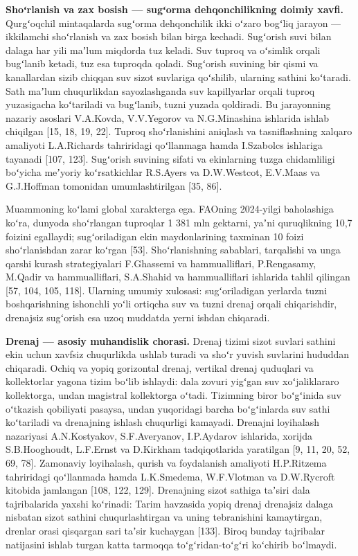 

\textbf{Shoʻrlanish va zax bosish --- sugʻorma dehqonchilikning doimiy
xavfi.} Qurgʻoqchil mintaqalarda sugʻorma dehqonchilik ikki oʻzaro
bogʻliq jarayon --- ikkilamchi shoʻrlanish va zax bosish bilan birga
kechadi. Sugʻorish suvi bilan dalaga har yili maʼlum miqdorda tuz
keladi. Suv tuproq va oʻsimlik orqali bugʻlanib ketadi, tuz esa tuproqda
qoladi. Sugʻorish suvining bir qismi va kanallardan sizib chiqqan suv
sizot suvlariga qoʻshilib, ularning sathini koʻtaradi. Sath maʼlum
chuqurlikdan sayozlashganda suv kapillyarlar orqali tuproq yuzasigacha
koʻtariladi va bugʻlanib, tuzni yuzada qoldiradi. Bu jarayonning nazariy
asoslari V.A.Kovda, V.V.Yegorov va N.G.Minashina ishlarida ishlab
chiqilgan {[}15, 18, 19, 22{]}. Tuproq shoʻrlanishini aniqlash va
tasniflashning xalqaro amaliyoti L.A.Richards tahriridagi qoʻllanmaga
hamda I.Szabolcs ishlariga tayanadi {[}107, 123{]}. Sugʻorish suvining
sifati va ekinlarning tuzga chidamliligi boʻyicha meʼyoriy
koʻrsatkichlar R.S.Ayers va D.W.Westcot, E.V.Maas va G.J.Hoffman
tomonidan umumlashtirilgan {[}35, 86{]}.

Muammoning koʻlami global xarakterga ega. FAOning 2024-yilgi baholashiga
koʻra, dunyoda shoʻrlangan tuproqlar 1 381 mln gektarni, yaʼni
quruqlikning 10,7 foizini egallaydi; sugʻoriladigan ekin maydonlarining
taxminan 10 foizi shoʻrlanishdan zarar koʻrgan {[}53{]}. Shoʻrlanishning
sabablari, tarqalishi va unga qarshi kurash strategiyalari F.Ghassemi va
hammualliflari, P.Rengasamy, M.Qadir va hammualliflari, S.A.Shahid va
hammualliflari ishlarida tahlil qilingan {[}57, 104, 105, 118{]}.
Ularning umumiy xulosasi: sugʻoriladigan yerlarda tuzni boshqarishning
ishonchli yoʻli ortiqcha suv va tuzni drenaj orqali chiqarishdir,
drenajsiz sugʻorish esa uzoq muddatda yerni ishdan chiqaradi.

\textbf{Drenaj --- asosiy muhandislik chorasi.} Drenaj tizimi sizot
suvlari sathini ekin uchun xavfsiz chuqurlikda ushlab turadi va shoʻr
yuvish suvlarini hududdan chiqaradi. Ochiq va yopiq gorizontal drenaj,
vertikal drenaj quduqlari va kollektorlar yagona tizim boʻlib ishlaydi:
dala zovuri yigʻgan suv xoʻjaliklararo kollektorga, undan magistral
kollektorga oʻtadi. Tizimning biror boʻgʻinida suv oʻtkazish qobiliyati
pasaysa, undan yuqoridagi barcha boʻgʻinlarda suv sathi koʻtariladi va
drenajning ishlash chuqurligi kamayadi. Drenajni loyihalash nazariyasi
A.N.Kostyakov, S.F.Averyanov, I.P.Aydarov ishlarida, xorijda
S.B.Hooghoudt, L.F.Ernst va D.Kirkham tadqiqotlarida yaratilgan {[}9,
11, 20, 52, 69, 78{]}. Zamonaviy loyihalash, qurish va foydalanish
amaliyoti H.P.Ritzema tahriridagi qoʻllanmada hamda L.K.Smedema,
W.F.Vlotman va D.W.Rycroft kitobida jamlangan {[}108, 122, 129{]}.
Drenajning sizot sathiga taʼsiri dala tajribalarida yaxshi koʻrinadi:
Tarim havzasida yopiq drenaj drenajsiz dalaga nisbatan sizot sathini
chuqurlashtirgan va uning tebranishini kamaytirgan, drenlar orasi
qisqargan sari taʼsir kuchaygan {[}133{]}. Biroq bunday tajribalar
natijasini ishlab turgan katta tarmoqqa toʻgʻridan-toʻgʻri koʻchirib
boʻlmaydi.


